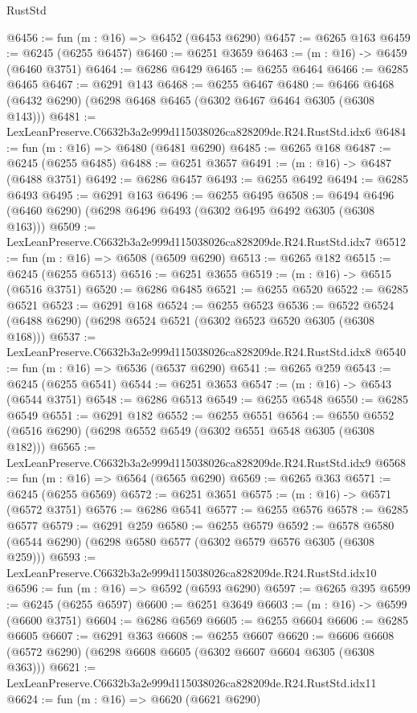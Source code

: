\begin{lexlean}{RustStd}
\begin{coremodule}
@6456 := fun (m : @16) => @6452 (@6453 @6290)
@6457 := @6265 @163
@6459 := @6245 (@6255 @6457)
@6460 := @6251 @3659
@6463 := (m : @16) -> @6459 (@6460 @3751)
@6464 := @6286 @6429
@6465 := @6255 @6464
@6466 := @6285 @6465
@6467 := @6291 @143
@6468 := @6255 @6467
@6480 := @6466 @6468 (@6432 @6290) (@6298 @6468 @6465 (@6302 @6467 @6464 @6305 (@6308 @143)))
@6481 := LexLeanPreserve.C6632b3a2e999d115038026ca828209de.R24.RustStd.idx6
@6484 := fun (m : @16) => @6480 (@6481 @6290)
@6485 := @6265 @168
@6487 := @6245 (@6255 @6485)
@6488 := @6251 @3657
@6491 := (m : @16) -> @6487 (@6488 @3751)
@6492 := @6286 @6457
@6493 := @6255 @6492
@6494 := @6285 @6493
@6495 := @6291 @163
@6496 := @6255 @6495
@6508 := @6494 @6496 (@6460 @6290) (@6298 @6496 @6493 (@6302 @6495 @6492 @6305 (@6308 @163)))
@6509 := LexLeanPreserve.C6632b3a2e999d115038026ca828209de.R24.RustStd.idx7
@6512 := fun (m : @16) => @6508 (@6509 @6290)
@6513 := @6265 @182
@6515 := @6245 (@6255 @6513)
@6516 := @6251 @3655
@6519 := (m : @16) -> @6515 (@6516 @3751)
@6520 := @6286 @6485
@6521 := @6255 @6520
@6522 := @6285 @6521
@6523 := @6291 @168
@6524 := @6255 @6523
@6536 := @6522 @6524 (@6488 @6290) (@6298 @6524 @6521 (@6302 @6523 @6520 @6305 (@6308 @168)))
@6537 := LexLeanPreserve.C6632b3a2e999d115038026ca828209de.R24.RustStd.idx8
@6540 := fun (m : @16) => @6536 (@6537 @6290)
@6541 := @6265 @259
@6543 := @6245 (@6255 @6541)
@6544 := @6251 @3653
@6547 := (m : @16) -> @6543 (@6544 @3751)
@6548 := @6286 @6513
@6549 := @6255 @6548
@6550 := @6285 @6549
@6551 := @6291 @182
@6552 := @6255 @6551
@6564 := @6550 @6552 (@6516 @6290) (@6298 @6552 @6549 (@6302 @6551 @6548 @6305 (@6308 @182)))
@6565 := LexLeanPreserve.C6632b3a2e999d115038026ca828209de.R24.RustStd.idx9
@6568 := fun (m : @16) => @6564 (@6565 @6290)
@6569 := @6265 @363
@6571 := @6245 (@6255 @6569)
@6572 := @6251 @3651
@6575 := (m : @16) -> @6571 (@6572 @3751)
@6576 := @6286 @6541
@6577 := @6255 @6576
@6578 := @6285 @6577
@6579 := @6291 @259
@6580 := @6255 @6579
@6592 := @6578 @6580 (@6544 @6290) (@6298 @6580 @6577 (@6302 @6579 @6576 @6305 (@6308 @259)))
@6593 := LexLeanPreserve.C6632b3a2e999d115038026ca828209de.R24.RustStd.idx10
@6596 := fun (m : @16) => @6592 (@6593 @6290)
@6597 := @6265 @395
@6599 := @6245 (@6255 @6597)
@6600 := @6251 @3649
@6603 := (m : @16) -> @6599 (@6600 @3751)
@6604 := @6286 @6569
@6605 := @6255 @6604
@6606 := @6285 @6605
@6607 := @6291 @363
@6608 := @6255 @6607
@6620 := @6606 @6608 (@6572 @6290) (@6298 @6608 @6605 (@6302 @6607 @6604 @6305 (@6308 @363)))
@6621 := LexLeanPreserve.C6632b3a2e999d115038026ca828209de.R24.RustStd.idx11
@6624 := fun (m : @16) => @6620 (@6621 @6290)

\end{coremodule}
\end{lexlean}
